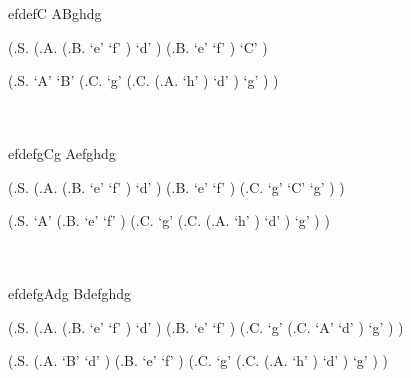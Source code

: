\documentclass[fleqn]{article}
\begin{document}
\begin{enumerate}
\begin{enumerate}
    \newpage
    efdefC \hspace{0.4\textwidth} ABghdg\\
    \begin{parsetree}
      (.S.
        (.A.
          (.B.
            `e'
            `f'
          )
          `d'
        )
        (.B.
          `e'
          `f'
        )
        `C'
      )
    \end{parsetree}
    \hspace{0.26\textwidth}
    \begin{parsetree}
      (.S.
        `A'
        `B'
        (.C.
          `g'
          (.C.
            (.A.
              `h'
            )
            `d'
          )
          `g'
        )
      )
    \end{parsetree}\\\\
  
    efdefgCg \hspace{0.4\textwidth} Aefghdg\\
    \begin{parsetree}
      (.S.
        (.A.
          (.B.
            `e'
            `f'
          )
          `d'
        )
        (.B.
          `e'
          `f'
        )
        (.C.
          `g'
          `C'
          `g'
        )
      )
    \end{parsetree}
    \hspace{0.2\textwidth}
    \begin{parsetree}
      (.S.
        `A'
        (.B.
          `e'
          `f'
        )
        (.C.
          `g'
          (.C.
            (.A.
              `h'
            )
            `d'
          )
          `g'
        )
      )
    \end{parsetree}\\\\
  
    efdefgAdg \hspace{0.4\textwidth} Bdefghdg\\
    \begin{parsetree}
      (.S.
        (.A.
          (.B.
            `e'
            `f'
          )
          `d'
        )
        (.B.
          `e'
          `f'
        )
        (.C.
          `g'
          (.C.
            `A'
            `d'
          )
          `g'
        )
      )
    \end{parsetree}
    \hspace{0.12\textwidth}
    \begin{parsetree}
      (.S.
        (.A.
          `B'
          `d'
        )
        (.B.
          `e'
          `f'
        )
        (.C.
          `g'
          (.C.
            (.A.
              `h'
            )
            `d'
          )
          `g'
        )
      )
    \end{parsetree}\\\\
    

\end{enumerate}
\end{enumerate}
\end{document}
